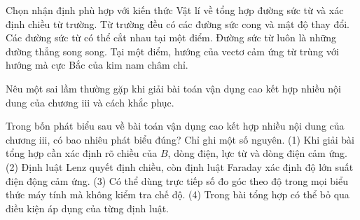 \begin{ex}
Chọn nhận định phù hợp với kiến thức Vật lí về tổng hợp đường sức từ và xác định chiều từ trường.
\choice
{Từ trường đều có các đường sức cong và mật độ thay đổi.}
{Các đường sức từ có thể cắt nhau tại một điểm.}
{Đường sức từ luôn là những đường thẳng song song.}
{\True Tại một điểm, hướng của vectơ cảm ứng từ trùng với hướng mà cực Bắc của kim nam châm chỉ.}
\end{ex}

\begin{bt}
Nêu một sai lầm thường gặp khi giải bài toán vận dụng cao kết hợp nhiều nội dung của chương iii và cách khắc phục.
\end{bt}

\begin{ex}
Trong bốn phát biểu sau về bài toán vận dụng cao kết hợp nhiều nội dung của chương iii, có bao nhiêu phát biểu đúng? Chỉ ghi một số nguyên. (1) Khi giải bài tổng hợp cần xác định rõ chiều của $B$, dòng điện, lực từ và dòng điện cảm ứng. (2) Định luật Lenz quyết định chiều, còn định luật Faraday xác định độ lớn suất điện động cảm ứng. (3) Có thể dùng trực tiếp số đo góc theo độ trong mọi biểu thức máy tính mà không kiểm tra chế độ. (4) Trong bài tổng hợp có thể bỏ qua điều kiện áp dụng của từng định luật.
\end{ex}

